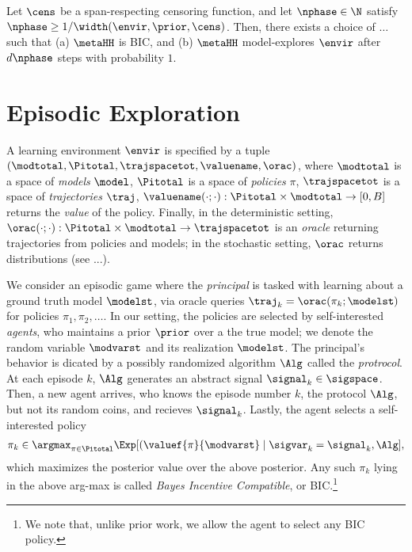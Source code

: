 \begin{theorem}\label{thm:meta-theorem} Let $\cens$ be a span-respecting censoring function, and let $\nphase \in \N$ satisfy $\nphase \ge 1/\width(\envir,\prior,\cens)$. Then, there exists a choice of $\dots$ such that (a) $\metaHH$ is BIC, and (b) $\metaHH$ model-explores $\envir$ after $d\nphase$ steps with probability $1$.
\end{theorem}




\section{Episodic Exploration}


 A learning environment $\envir$ is specified by a tuple $(\modtotal,\Pitotal,\trajspacetot,\valuename,\orac)$, where $\modtotal$ is a space of \emph{models} $\model$, $\Pitotal$ is a space of \emph{policies} $\pi$, $\trajspacetot$ is a space of \emph{trajectories} $\traj$, $\valuename(\cdot;\cdot):\Pitotal \times \modtotal \to [0,B]$ returns the \emph{value} of the policy. Finally, in the deterministic setting, $\orac(\cdot;\cdot): \Pitotal \times \modtotal \to \trajspacetot$ is an \emph{oracle} returning trajectories from policies and models; in the stochastic setting, $\orac$ returns distributions (see ...).

 We consider an episodic game where the \emph{principal} is tasked with learning about a ground truth model $\modelst$, via oracle queries $\traj_k = \orac(\pi_k;\modelst)$ for policies $\pi_1,\pi_2,\dots$. In our setting, the policies are selected by self-interested \emph{agents}, who maintains a prior $\prior$ over a the true model; we denote the random variable $\modvarst$ and its realization $\modelst$.  The principal's behavior is dicated by a possibly randomized algorithm $\Alg$ called the \emph{protrocol}. 
%
At each episode $k$, $\Alg$ generates an abstract signal $\signal_k \in \sigspace$. Then, a new agent arrives, who knows the episode number $k$, the protocol $\Alg$, but not its random coins, and recieves $\signal_k$. Lastly, the agent selects a self-interested policy
\begin{align}
\pi_k \in \argmax_{\pi \in \Pitotal} \Exp[(\valuef{\pi}{\modvarst} \mid \sigvar_k = \signal_k,\Alg],
\end{align}
which maximizes the posterior value over the above posterior. Any such $\pi_k$ lying in the above arg-max is called \emph{Bayes Incentive Compatible}, or BIC.\footnote{We note that, unlike prior work, we allow the agent to select any BIC policy.} 


